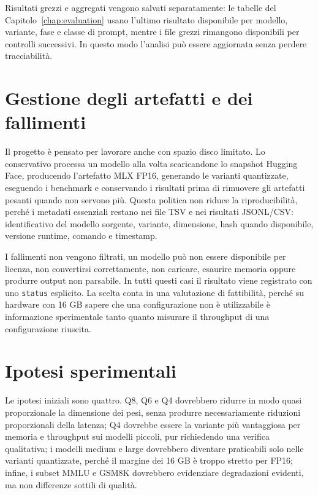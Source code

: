 Risultati grezzi e aggregati vengono salvati separatamente: le tabelle del
Capitolo~\ref{chap:evaluation} usano l'ultimo risultato disponibile per modello,
variante, fase e classe di prompt, mentre i file grezzi rimangono disponibili
per controlli successivi. In questo modo l'analisi può essere aggiornata senza
perdere tracciabilità.

\section{Gestione degli artefatti e dei fallimenti}
\label{sec:experimental_failure_policy}

Il progetto è pensato per lavorare anche con spazio disco limitato. 
Lo conservativo processa un modello alla volta scaricandone lo
snapshot Hugging Face, producendo l'artefatto MLX FP16, generando le varianti
quantizzate, eseguendo i benchmark e conservando i risultati prima di rimuovere gli
artefatti pesanti quando non servono più. Questa politica non riduce la
riproducibilità, perché i metadati essenziali restano nei file TSV e nei
risultati JSONL/CSV: identificativo del modello sorgente, variante, dimensione,
hash quando disponibile, versione runtime, comando e timestamp.

I fallimenti non vengono filtrati, un modello può non essere disponibile per
licenza, non convertirsi correttamente, non caricare, esaurire memoria oppure
produrre output non parsabile. In tutti questi casi il risultato viene
registrato con uno \texttt{status} esplicito. La scelta conta in una valutazione
di fattibilità, perché su hardware con 16 GB sapere che una configurazione non è
utilizzabile è informazione sperimentale tanto quanto misurare il throughput di
una configurazione riuscita.

\section{Ipotesi sperimentali}
\label{sec:experimental_hypotheses}

Le ipotesi iniziali sono quattro. Q8, Q6 e Q4 dovrebbero ridurre in modo quasi
proporzionale la dimensione dei pesi, senza produrre necessariamente riduzioni
proporzionali della latenza; Q4 dovrebbe essere la variante più vantaggiosa per
memoria e throughput sui modelli piccoli, pur richiedendo una verifica
qualitativa; i modelli medium e large dovrebbero diventare praticabili solo
nelle varianti quantizzate, perché il margine dei 16 GB è troppo stretto per
FP16; infine, i subset MMLU e GSM8K dovrebbero evidenziare degradazioni
evidenti, ma non differenze sottili di qualità.

